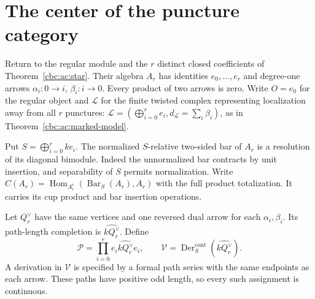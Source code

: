 \section{The center of the puncture category}

Return to the regular module and the \(r\) distinct closed coefficients
of Theorem~\ref{cbc:ac:star}.  Their algebra \(A_r\) has identities
\(e_0,\ldots,e_r\) and degree-one arrows
\(\alpha_i:0\to i\), \(\beta_i:i\to0\).
Every product of two arrows is zero.
Write $O=e_0$ for the regular object and $\mathcal L$ for
the finite twisted complex representing localization away from
all $r$ punctures:
$\mathcal L=(\bigoplus_{i=0}^r e_i,d_{\mathcal L}=\sum_i\beta_i)$,
as in Theorem~\ref{cbc:ac:marked-model}.

Put \(S=\bigoplus_{i=0}^rke_i\).  The normalized \(S\)-relative
two-sided bar of \(A_r\) is a resolution of its diagonal bimodule.
Indeed the unnormalized bar contracts by unit insertion, and
separability of \(S\) permits normalization.  Write
\(C(A_r)=\operatorname{Hom}_{A_r^e}(\operatorname{Bar}_S(A_r),A_r)\)
with the full product totalization.  It carries its cup product
and bar insertion operations.

Let \(Q_r^\vee\) have the same vertices and one reversed dual arrow
for each \(\alpha_i,\beta_i\).  Its path-length completion is
\(\widehat{kQ_r^\vee}\).  Define
\[
 \mathcal P=\prod_{i=0}^r e_i\widehat{kQ_r^\vee}e_i,
 \qquad
 \mathcal V=\operatorname{Der}^{\mathrm{cont}}_S(\widehat{kQ_r^\vee}).
\]
A derivation in \(\mathcal V\) is specified by a formal path series
with the same endpoints as each arrow.  These paths have positive
odd length, so every such assignment is continuous.

